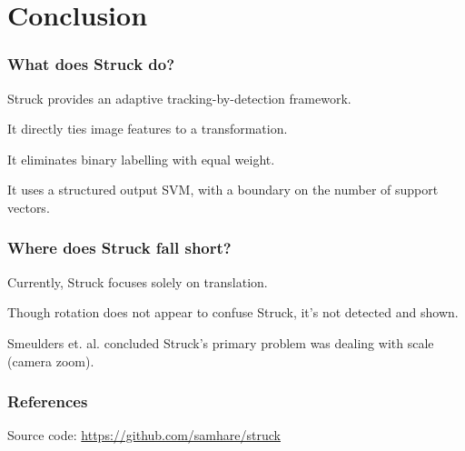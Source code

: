\section{Conclusion}

\begin{frame}
    \frametitle{What does Struck do?}
    Struck provides an adaptive tracking-by-detection framework.

    It directly ties image features to a transformation.

    It eliminates binary labelling with equal weight.

    It uses a structured output SVM, with a boundary on the number of support vectors.
\end{frame}

\begin{frame}
    \frametitle{Where does Struck fall short?}
    Currently, Struck focuses solely on translation.

    Though rotation does not appear to confuse Struck, it's not detected and shown.

    Smeulders et. al. concluded Struck's primary problem was dealing with scale (camera zoom).
\end{frame}

\begin{frame}
    \frametitle{References}
    \nocite{*}
    
    

    Source code: \url{https://github.com/samhare/struck}
\end{frame}

